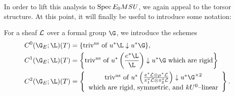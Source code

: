 In order to lift this analysis to \(\operatorname{Spec} E_0 M\mathit{SU}\), we again appeal to the torsor structure.
At this point, it will finally be useful to introduce some notation:
\begin{definition}
For a sheaf \(\mathcal{L}\) over a formal group \(\G\), we introduce the schemes
\begin{align*}
C^0(\G_E; \L)(T) & = \{\text{triv\textsuperscript{ns} of \(u^* \L \downarrow u^* \G\)}\} , \\
C^1(\G_E; \L)(T) & = \left\{\text{triv\textsuperscript{ns} of \(u^* \left( \frac{e^* \L}{\L} \right) \downarrow u^* \G\) which are rigid}\right\} \\
C^2(\G_E; \L)(T) & = \left\{\begin{array}{c}\text{triv\textsuperscript{ns} of \(u^*\left(\frac{e^* \sheaf L \otimes \mu^* \sheaf L}{\pi_1^* \sheaf L \otimes \pi_2^* \sheaf L}\right) \downarrow u^* \G^{\times 2}\)} \\ \text{which are rigid, symmetric, and \(kU^0\)--linear} \end{array}\right\}.
\end{align*}
\end{definition}

